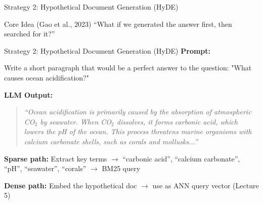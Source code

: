 \documentclass[aspectratio=169]{beamer}
\newif\ifanimated
\newcommand{\cpause}{\ifanimated\pause\fi}
\begin{document}
\begin{frame}[shrink=25]{Strategy 2: Hypothetical Document Generation (HyDE)}

\begin{exampleblock}{Core Idea (Gao et al., 2023)}
``What if we generated the answer first, then searched for it?''
\end{exampleblock}

\vspace{1em}

\begin{center}
\end{center}
\cpause
\end{frame}

\begin{frame}[shrink=25]{Strategy 2: Hypothetical Document Generation (HyDE)}
\textbf{Prompt:}
\begin{tcolorbox}[colback=gray!10, colframe=gray!50, fontupper=\small\ttfamily]
Write a short paragraph that would be a perfect answer to the question: "What causes ocean acidification?"
\end{tcolorbox}

\vspace{0.3em}

\textbf{LLM Output:}
\begin{quote}
\small\itshape
``Ocean acidification is primarily caused by the absorption of atmospheric CO$_2$ by seawater. When CO$_2$ dissolves, it forms carbonic acid, which lowers the pH of the ocean. This process threatens marine organisms with calcium carbonate shells, such as corals and mollusks...''
\end{quote}

\vspace{0.3em}

\textbf{Sparse path:} Extract key terms $\to$ ``carbonic acid'', ``calcium carbonate'', ``pH'', ``seawater'', ``corals'' $\to$ BM25 query

\vspace{0.3em}

\textbf{Dense path:} Embed the hypothetical doc $\to$ use as ANN query vector (Lecture 5)\cpause

\end{frame}
\end{document}
